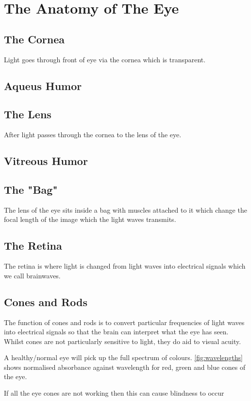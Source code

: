 
\chapter{The Anatomy of The Eye}

\label{anatomy} %


\section{The Cornea}

Light goes through front of eye via the cornea which is transparent.\cite{}

\section{Aqueus Humor}

\section{The Lens}
After light passes through the cornea to the lens of the eye.

\section{Vitreous Humor}

\section{The "Bag"}
The lens of the eye sits inside a bag with muscles attached to it which change
the focal length of the image which the light waves transmits.

\section{The Retina}
The retina is where light is changed from light waves into electrical signals
which we call brainwaves.

\section{Cones and Rods}

The function of cones and rods is to convert particular frequencies of light
waves
into electrical signals so that the brain can interpret what the eye has seen.
Whilst cones are not particularly sensitive to light, they do aid to visual
acuity.
\cite{}

A healthy/normal eye will pick up the full spectrum of colours.
\ref{fig:wavelengths} shows normalised absorbance against wavelength for red,
green and blue cones of the eye.

If all the eye cones are not working then this can cause
blindness to occur\cite{}
